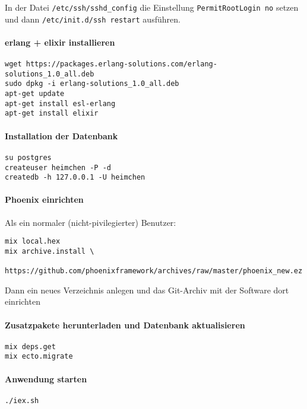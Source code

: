 \documentclass[12pt]{scrreprt}
\begin{document}
In der Datei \verb|/etc/ssh/sshd_config| die Einstellung \verb|PermitRootLogin no| setzen und dann
\verb|/etc/init.d/ssh restart| ausführen.

\paragraph{erlang + elixir installieren}

\begin{verbatim}
wget https://packages.erlang-solutions.com/erlang-solutions_1.0_all.deb 
sudo dpkg -i erlang-solutions_1.0_all.deb
apt-get update
apt-get install esl-erlang
apt-get install elixir
\end{verbatim}


\paragraph{Installation der Datenbank}
\begin{verbatim}
su postgres
createuser heimchen -P -d
createdb -h 127.0.0.1 -U heimchen
\end{verbatim}

\paragraph{Phoenix einrichten}

Als ein normaler (nicht-pivilegierter) Benutzer:

\begin{verbatim}
mix local.hex
mix archive.install \
    https://github.com/phoenixframework/archives/raw/master/phoenix_new.ez
\end{verbatim}


Dann ein neues Verzeichnis anlegen und das Git-Archiv mit der Software
dort einrichten


\paragraph{Zusatzpakete herunterladen und Datenbank aktualisieren}
\begin{verbatim}
mix deps.get
mix ecto.migrate
\end{verbatim}

\paragraph{Anwendung starten}

\begin{verbatim}
./iex.sh
\end{verbatim}
\end{document}
